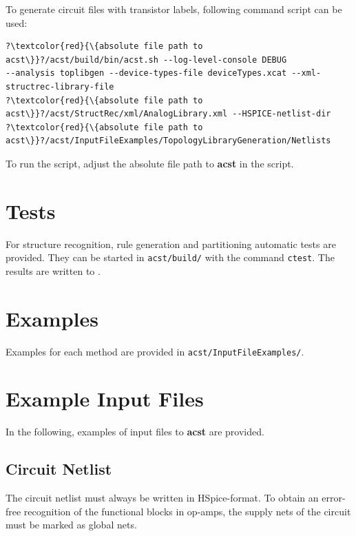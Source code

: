 To generate circuit files with transistor labels, following command script can be used:
\begin{lstlisting}[basicstyle=\ttfamily\scriptsize,backgroundcolor={\color{gray!30}}, escapechar=? ]
?\textcolor{red}{\{absolute file path to acst\}}?/acst/build/bin/acst.sh --log-level-console DEBUG 
--analysis toplibgen --device-types-file deviceTypes.xcat --xml-structrec-library-file 
?\textcolor{red}{\{absolute file path to acst\}}?/acst/StructRec/xml/AnalogLibrary.xml --HSPICE-netlist-dir 
?\textcolor{red}{\{absolute file path to acst\}}?/acst/InputFileExamples/TopologyLibraryGeneration/Netlists
\end{lstlisting}
To run the script, adjust the absolute file path to {\bf acst} in the script.



\chapter{Tests}\label{ch:Tests}

For structure recognition, rule generation and partitioning automatic tests are provided. They can be started in {\tt acst/build/} with the command {\tt ctest}. The results are written to .


\chapter{Examples}\label{ch:Examples}
Examples for each method are provided in {\tt acst/InputFileExamples/}.

\newpage
\appendix
\chapter{Example Input Files}\label{ch:exampleInputFiles}
In the following, examples of input files to {\bf acst} are provided.

\section{Circuit Netlist}\label{sec:inputFileCircuitNetlist}
The circuit netlist must always be written in HSpice-format. To obtain an error-free recognition of the functional blocks in op-amps, the supply nets of the circuit must be marked as global nets.

